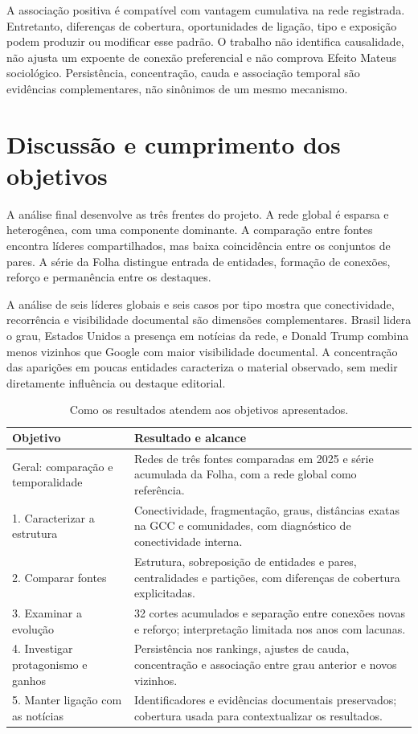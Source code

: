 \documentclass[11pt,a4paper]{article}
\begin{document}
A associação positiva é compatível com vantagem cumulativa na rede registrada. Entretanto, diferenças de cobertura, oportunidades de ligação, tipo e exposição podem produzir ou modificar esse padrão. O trabalho não identifica causalidade, não ajusta um expoente de conexão preferencial e não comprova Efeito Mateus sociológico. Persistência, concentração, cauda e associação temporal são evidências complementares, não sinônimos de um mesmo mecanismo.

\clearpage
\section{Discussão e cumprimento dos objetivos}
A análise final desenvolve as três frentes do projeto. A rede global é esparsa e heterogênea, com uma componente dominante. A comparação entre fontes encontra líderes compartilhados, mas baixa coincidência entre os conjuntos de pares. A série da Folha distingue entrada de entidades, formação de conexões, reforço e permanência entre os destaques.

A análise de seis líderes globais e seis casos por tipo mostra que conectividade, recorrência e visibilidade documental são dimensões complementares. Brasil lidera o grau, Estados Unidos a presença em notícias da rede, e Donald Trump combina menos vizinhos que Google com maior visibilidade documental. A concentração das aparições em poucas entidades caracteriza o material observado, sem medir diretamente influência ou destaque editorial.

\begin{table}[H]\centering\small
\caption{Como os resultados atendem aos objetivos apresentados.}\label{tab:objetivos}
\begin{tabularx}{\linewidth}{p{3.8cm}X}\toprule
Objetivo & Resultado e alcance\\\midrule
Geral: comparação e temporalidade & Redes de três fontes comparadas em 2025 e série acumulada da Folha, com a rede global como referência.\\
1. Caracterizar a estrutura & Conectividade, fragmentação, graus, distâncias exatas na GCC e comunidades, com diagnóstico de conectividade interna.\\
2. Comparar fontes & Estrutura, sobreposição de entidades e pares, centralidades e partições, com diferenças de cobertura explicitadas.\\
3. Examinar a evolução & 32 cortes acumulados e separação entre conexões novas e reforço; interpretação limitada nos anos com lacunas.\\
4. Investigar protagonismo e ganhos & Persistência nos rankings, ajustes de cauda, concentração e associação entre grau anterior e novos vizinhos.\\
5. Manter ligação com as notícias & Identificadores e evidências documentais preservados; cobertura usada para contextualizar os resultados.\\\bottomrule
\end{tabularx}\end{table}
\end{document}

